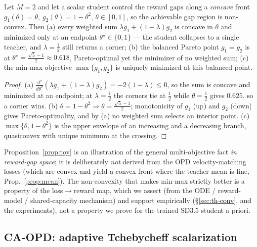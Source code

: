 \begin{proposition}
\label{prop:toy}
Let $M{=}2$ and let a scalar student control the reward gaps along a \emph{concave}
front $g_1(\theta)=\theta,\ g_2(\theta)=1-\theta^2$, $\theta\in[0,1]$, so the achievable
gap region is non-convex. Then (a) every weighted sum
$\lambda g_1+(1-\lambda)g_2$ is concave in $\theta$ and minimized only at an endpoint
$\theta^\star\in\{0,1\}$ --- the student collapses to a single teacher, and $\lambda{=}\tfrac12$
still returns a corner; (b) the balanced Pareto point $g_1{=}g_2$ is at
$\theta^\star=\tfrac{\sqrt5-1}{2}\approx0.618$, Pareto-optimal yet the minimizer of no
weighted sum; (c) the min-max objective $\max\{g_1,g_2\}$ is uniquely minimized at this
balanced point.
\end{proposition}

\begin{proof}
(a) $\frac{d^2}{d\theta^2}(\lambda g_1+(1-\lambda)g_2)=-2(1-\lambda)\le0$, so the sum is
concave and minimized at an endpoint; at $\lambda{=}\tfrac12$ the corners tie at
$\tfrac12$ while $\theta{=}\tfrac12$ gives $0.625$, so a corner wins. (b)
$\theta=1-\theta^2\Rightarrow\theta=\tfrac{\sqrt5-1}{2}$; monotonicity of $g_1$ (up) and
$g_2$ (down) gives Pareto-optimality, and by (a) no weighted sum selects an interior
point. (c) $\max\{\theta,1-\theta^2\}$ is the upper envelope of an increasing and a
decreasing branch, quasiconvex with unique minimum at the crossing.
\end{proof}

\begin{remark}
\label{rem:toyread}
Proposition~\ref{prop:toy} is an illustration of the general multi-objective fact
\emph{in reward-gap space}; it is deliberately \emph{not} derived from the OPD
velocity-matching losses (which are convex and yield a convex front where the
teacher-mean is fine, Prop.~\ref{prop:mean}). The non-convexity that makes min-max
strictly better is a property of the loss$\to$reward map, which we assert (from the ODE
/ reward-model / shared-capacity mechanism) and support empirically
(\S\ref{sec:th-conv}, and the experiments), not a property we prove for the trained
SD3.5 student a priori.
\end{remark}

\subsection{CA-OPD: adaptive Tchebycheff scalarization}
\label{sec:th-cheby}

